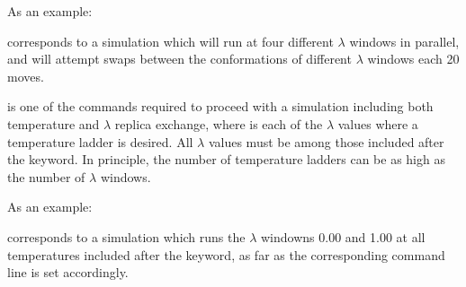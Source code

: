 \documentclass[letterpaper,10pt,english]{sphinxmanual}
\begin{document}
As an example:

%
\begin{sphinxVerbatim}[commandchars=\\\{\}]
     
\end{sphinxVerbatim}

corresponds to a simulation which will run at four different \(\lambda\) windows in parallel, and will attempt swaps between the conformations of different \(\lambda\) windows each 20 moves.


\ignorespaces 
\def\sphinxLiteralBlockLabel{\label{\detokenize{protoms:index-49}}}
%
\begin{sphinxVerbatim}[commandchars=\\\{\}]
   
\end{sphinxVerbatim}

is one of the commands required to proceed with a simulation including both temperature and \(\lambda\) replica exchange, where  is each of the \(\lambda\) values where a temperature ladder is desired. All \(\lambda\) values must be among those included after the  keyword. In principle, the number of temperature ladders can be as high as the number of \(\lambda\) windows.

As an example:

%
\begin{sphinxVerbatim}[commandchars=\\\{\}]
   
\end{sphinxVerbatim}

corresponds to a simulation which runs the \(\lambda\) windowns 0.00 and 1.00 at all temperatures included after the  keyword, as far as the corresponding  command line is set accordingly.

\ignorespaces 
\def\sphinxLiteralBlockLabel{\label{\detokenize{protoms:index-50}}}
%
\begin{sphinxVerbatim}[commandchars=\\\{\}]
   
\end{sphinxVerbatim}
\end{document}
